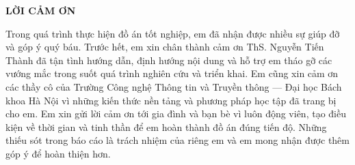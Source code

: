 \documentclass[../DoAn.tex]{subfiles}
\begin{document}
\begin{center}
    \Large{\textbf{LỜI CẢM ƠN}}\\
\end{center}
\vspace{1cm}
Trong quá trình thực hiện đồ án tốt nghiệp, em đã nhận được nhiều sự giúp đỡ và góp ý quý báu. Trước hết, em xin chân thành cảm ơn ThS. Nguyễn Tiến Thành đã tận tình hướng dẫn, định hướng nội dung và hỗ trợ em tháo gỡ các vướng mắc trong suốt quá trình nghiên cứu và triển khai. Em cũng xin cảm ơn các thầy cô của Trường Công nghệ Thông tin và Truyền thông --- Đại học Bách khoa Hà Nội vì những kiến thức nền tảng và phương pháp học tập đã trang bị cho em. Em xin gửi lời cảm ơn tới gia đình và bạn bè vì luôn động viên, tạo điều kiện về thời gian và tinh thần để em hoàn thành đồ án đúng tiến độ. Những thiếu sót trong báo cáo là trách nhiệm của riêng em và em mong nhận được thêm góp ý để hoàn thiện hơn.
\end{document}
